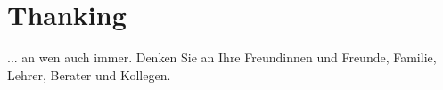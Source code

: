 \documentclass[a4paper,11pt,oneside,final,english,toc=bib,draft]{scrbook}
\begin{document}

\chapter{Thanking} %
\label{cha:thanking}

... an wen auch immer. Denken Sie an Ihre Freundinnen und Freunde, 
Familie, Lehrer, Berater und Kollegen.





% 

\end{document}
